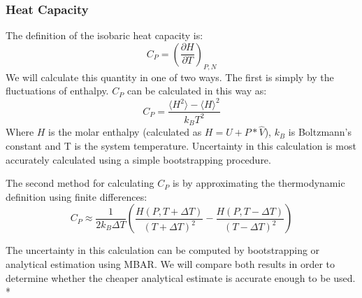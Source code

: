 \documentclass[aps,pre,nofootinbib,superscriptaddress,linenumbers,10pt, draft,tightenlines]{revtex4-1}
\begin{document}
\begin{itemize}
\begin{itemize}
    	\subsubsection{Heat Capacity}
    	The definition of the isobaric heat capacity is:
    	\begin{equation}C_P = \left( \frac{\partial H}{\partial T}\right)_{P,N}\end{equation}
    	We will calculate this quantity in one of two ways. The first is simply by the fluctuations of enthalpy.
    	$C_P$ can be calculated in this way as:
    	\begin{equation} C_P = \frac{\langle H^2 \rangle - \langle H \rangle^2}{k_B T^2} \end{equation}
    	Where $H$ is the molar enthalpy (calculated as $H = U + P*\hat{V}$), $k_B$ is Boltzmann's constant and T 
    	is the system temperature.
    	Uncertainty in this calculation is most accurately calculated using a simple bootstrapping procedure.
    	
    	The second method for calculating $C_P$ is by approximating the thermodynamic definition using 
    	finite differences:
    	\begin{equation} C_P \approx \frac{1}{2 k_B \Delta T}\left(\frac{H(P,T+\Delta T)}{(T+\Delta T)^2} - \frac{H(P,T-\Delta T)}{(T-\Delta T)^2}\right) \end{equation}
    	
    	The uncertainty in this calculation can be computed by bootstrapping or analytical estimation using MBAR. We will 
    	compare both results in order to determine whether the cheaper analytical estimate is accurate enough to be used.\\*  
    	

\end{itemize}
\end{itemize}
\end{document}
